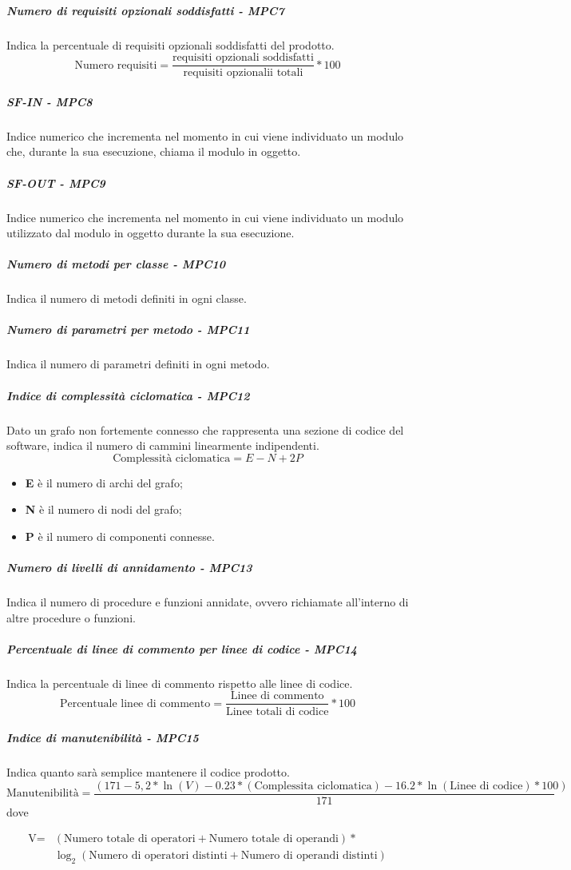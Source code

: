 \subparagraph{Numero di requisiti opzionali soddisfatti - MPC7}
Indica la percentuale di requisiti opzionali soddisfatti del prodotto.
\begin{equation*}
\text{Numero requisiti} = \frac{\text{requisiti opzionali soddisfatti}}{\text{requisiti opzionalii totali}} * 100
\end{equation*}
\subparagraph{SF-IN - MPC8}
Indice numerico che incrementa nel momento in cui viene individuato un modulo che, durante la sua esecuzione, chiama il modulo in oggetto.
\subparagraph{SF-OUT - MPC9}
Indice numerico che incrementa nel momento in cui viene individuato un modulo utilizzato dal modulo in oggetto durante la sua esecuzione.
\subparagraph{Numero di metodi per classe - MPC10}
Indica il numero di metodi definiti in ogni classe.
\subparagraph{Numero di parametri per metodo - MPC11}
Indica il numero di parametri definiti in ogni metodo.
\subparagraph{Indice di complessità ciclomatica - MPC12}
Dato un grafo non fortemente connesso che rappresenta una sezione di codice del software, indica il numero di cammini linearmente indipendenti.
\begin{equation*}
\text{Complessità ciclomatica} = E - N + 2P
\end{equation*}
\begin{itemize}
	\item \textbf{E} è il numero di archi del grafo;
	\item \textbf{N} è il numero di nodi del grafo;
	\item \textbf{P} è il numero di componenti connesse.
\end{itemize}
\subparagraph{Numero di livelli di annidamento - MPC13}
Indica il numero di procedure e funzioni annidate, ovvero richiamate all'interno di altre procedure o funzioni.
\subparagraph{Percentuale di linee di commento per linee di codice - MPC14}
Indica la percentuale di linee di commento rispetto alle linee di codice.
\begin{equation*}
\text{Percentuale linee di commento} = \frac{\text{Linee di commento}}{\text{Linee totali di codice}} * 100
\end{equation*}
\subparagraph{Indice di manutenibilità - MPC15}
Indica quanto sarà semplice mantenere il codice prodotto.
\begin{equation*}
\text{Manutenibilità} =\frac{(171 - 5,2 * \ln(V) - 0.23 * (\text{Complessita ciclomatica}) - 16.2 * \ln(\text{Linee di codice})*100)}{171}
\end{equation*}
dove 

\begin{align*}
\text{V} = & (\text{Numero totale di operatori} + \text{Numero totale di operandi})* \\ 
& \log_2 (\text{Numero di operatori distinti}+\text{Numero di operandi distinti})
\end{align*}


